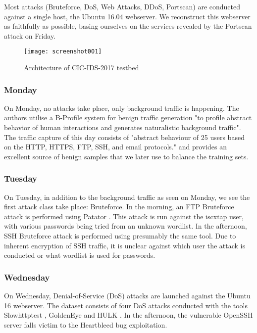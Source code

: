 Most attacks (Bruteforce, DoS, Web Attacks, DDoS, Portscan) are conducted against a single host, the Ubuntu 16.04 webserver. We reconstruct this webserver as faithfully as possible, basing ourselves on the services revealed by the Portscan attack on Friday.

\begin{figure}
	\centering
	\texttt{[image: screenshot001]}
	\caption{Architecture of CIC-IDS-2017 testbed}
	\label{fig:cic_2017_testbed}
\end{figure}



\subsubsection{Monday}

On Monday, no attacks take place, only background traffic is happening. The authors utilise a B-Profile system \cite{b_profile} for benign traffic generation "to profile abstract behavior of human interactions and generates naturalistic background traffic"\cite{cic_2017}. The traffic capture of this day consists of "abstract behaviour of 25 users based on the HTTP, HTTPS, FTP, SSH, and email protocols." \cite{cic_2017} and provides an excellent source of benign samples that we later use to balance the training sets.

\subsubsection{Tuesday}
On Tuesday, in addition to the background traffic as seen on Monday, we see the first attack class take place: Bruteforce. In the morning, an FTP Bruteforce attack is performed using Patator \cite{patator}. This attack is run against the iscxtap user, with various passwords being tried from an unknown wordlist. In the afternoon, SSH Bruteforce attack is performed using presumably the same tool. Due to inherent encryption of SSH traffic, it is unclear against which user the attack is conducted or what wordlist is used for passwords.

\subsubsection{Wednesday}
On Wednesday, Denial-of-Service (DoS) attacks are launched against the Ubuntu 16 webserver. The dataset consists of four DoS attacks conducted with the tools Slowhttptest \cite{slowhttptest}, GoldenEye \cite{goldeneye} and HULK \cite{hulk}. In the afternoon, the vulnerable OpenSSH server falls victim to the Heartbleed bug \cite{heartbleed} exploitation.  


